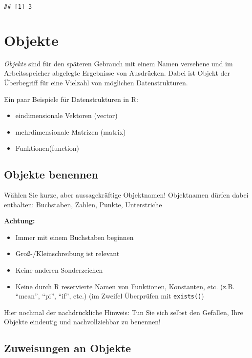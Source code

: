 \documentclass[
]{book}
\providecommand{\tightlist}{%
  \setlength{\itemsep}{0pt}\setlength{\parskip}{0pt}}
\begin{document}
\begin{verbatim}
## [1] 3
\end{verbatim}

\hypertarget{objekte}{%
\section{Objekte}\label{objekte}}

\emph{Objekte} sind für den späteren Gebrauch mit einem Namen versehene und im Arbeitsspeicher abgelegte Ergebnisse von Ausdrücken.
Dabei ist Objekt der Überbegriff für eine Vielzahl von möglichen Datenstrukturen.

Ein paar Beispiele für Datenstrukturen in R:

\begin{itemize}
\tightlist
\item
  eindimensionale Vektoren (vector)
\item
  mehrdimensionale Matrizen (matrix)
\item
  Funktionen(function)
\end{itemize}

\hypertarget{objekte-benennen}{%
\subsection*{Objekte benennen}\label{objekte-benennen}}

Wählen Sie kurze, aber aussagekräftige Objektnamen! Objektnamen dürfen dabei enthalten: Buchstaben, Zahlen, Punkte, Unterstriche

\textbf{Achtung:}

\begin{itemize}
\tightlist
\item
  Immer mit einem Buchstaben beginnen
\item
  Groß-/Kleinschreibung ist relevant
\item
  Keine anderen Sonderzeichen
\item
  Keine durch R reservierte Namen von Funktionen, Konstanten, etc. (z.B. ``mean'', ``pi'', ``if'', etc.) (im Zweifel Überprüfen mit \texttt{exists()})
\end{itemize}

Hier nochmal der nachdrückliche Hinweis: Tun Sie sich selbst den Gefallen, Ihre Objekte eindeutig und nachvollziehbar zu benennen!

\hypertarget{zuweisungen-an-objekte}{%
\subsection*{Zuweisungen an Objekte}\label{zuweisungen-an-objekte}}
\end{document}
